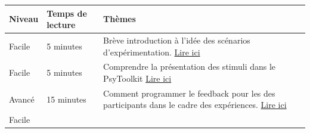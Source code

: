 \documentclass[
]{book}
\begin{document}
\begin{longtable}[]{@{}lll@{}}
\toprule
\begin{minipage}[b]{0.11\columnwidth}\raggedright
Niveau\strut
\end{minipage} & \begin{minipage}[b]{0.13\columnwidth}\raggedright
Temps de lecture\strut
\end{minipage} & \begin{minipage}[b]{0.67\columnwidth}\raggedright
Thèmes\strut
\end{minipage}\tabularnewline
\midrule
\endhead
\begin{minipage}[t]{0.11\columnwidth}\raggedright
Facile\strut
\end{minipage} & \begin{minipage}[t]{0.13\columnwidth}\raggedright
5 minutes\strut
\end{minipage} & \begin{minipage}[t]{0.67\columnwidth}\raggedright
Brève introduction à l'idée des scénarios d'expérimentation. \protect\hyperlink{s4-1}{Lire ici}\strut
\end{minipage}\tabularnewline
\begin{minipage}[t]{0.11\columnwidth}\raggedright
Facile\strut
\end{minipage} & \begin{minipage}[t]{0.13\columnwidth}\raggedright
5 minutes\strut
\end{minipage} & \begin{minipage}[t]{0.67\columnwidth}\raggedright
Comprendre la présentation des stimuli dans le PsyToolkit \protect\hyperlink{s4-2}{Lire ici}\strut
\end{minipage}\tabularnewline
\begin{minipage}[t]{0.11\columnwidth}\raggedright
Avancé\strut
\end{minipage} & \begin{minipage}[t]{0.13\columnwidth}\raggedright
15 minutes\strut
\end{minipage} & \begin{minipage}[t]{0.67\columnwidth}\raggedright
Comment programmer le feedback pour les des participants dans le cadre des expériences. \protect\hyperlink{s4-3}{Lire ici}\strut
\end{minipage}\tabularnewline
\begin{minipage}[t]{0.11\columnwidth}\raggedright
Facile\strut
\end{minipage} & \begin{minipage}[t]{0.13\columnwidth}\raggedright

\end{minipage}
\end{longtable}
\end{document}
